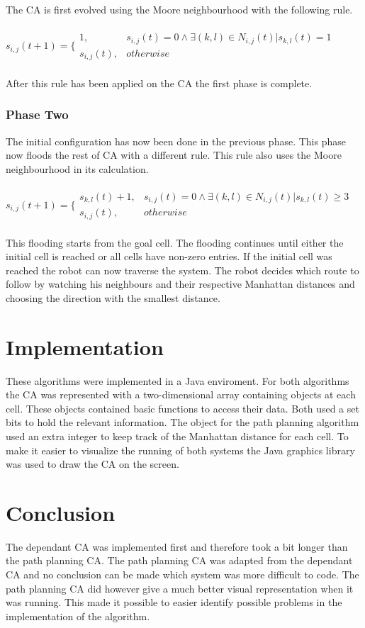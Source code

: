 \documentclass[a4paper,11pt,titlepage]{article}
\begin{document}
The CA is first evolved using the Moore neighbourhood with the following rule.\\\\
 $s_{i,j}(t+1)=\bigg\lbrace \begin{array}{ll} 1, & s_{i,j}(t)=0\wedge \exists (k,l) \in N_{i,j}(t) | s_{k,l}(t)=1 \\s_{i,j}(t), & otherwise \end{array}$\\\\
After this rule has been applied on the CA the first phase is complete.
\subsubsection{Phase Two}
The initial configuration has now been done in the previous phase. This phase now floods the rest of CA with a different rule. This rule also uses the Moore neighbourhood in its calculation.\\\\
$s_{i,j}(t+1)=\bigg\lbrace \begin{array}{ll} s_{k,l}(t)+1, & s_{i,j}(t)=0\wedge \exists (k,l) \in N_{i,j}(t) | s_{k,l}(t) \geq 3 \\s_{i,j}(t), & otherwise \end{array}$\\\\
This flooding starts from the goal cell. The flooding continues until either the initial cell is reached or all cells have non-zero entries. If the initial cell was reached the robot can now traverse the system. The robot decides which route to follow by watching his neighbours and their respective Manhattan distances and choosing the direction with the smallest distance.
\section{Implementation}
These algorithms were implemented in a Java enviroment. For both algorithms the CA was represented with a two-dimensional array containing objects at each cell. These objects contained basic functions to access their data. Both used a set bits to hold the relevant information. The object for the path planning algorithm used an extra integer to keep track of the Manhattan distance for each cell. To make it easier to visualize the running of both systems the Java graphics library was used to draw the CA on the screen.
\section{Conclusion}
The dependant CA was implemented first and therefore took a bit longer than the path planning CA. The path planning CA was adapted from the dependant CA and no conclusion can be made which system was more difficult to code. The path planning CA did however give a much better visual representation when it was running. This made it possible to easier identify possible problems in the implementation of the algorithm.
\end{document}
